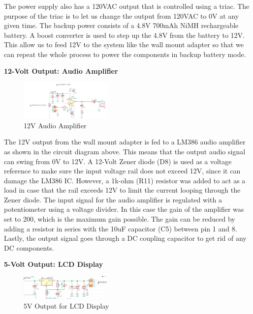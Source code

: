 \documentclass[journal,compsoc]{IEEEtran}
\begin{document}
The power supply also has a 120VAC output that is controlled using a triac. The purpose of the triac is to let us change the output from 120VAC to 0V at any given time. The backup power consists of a 4.8V 700mAh NiMH rechargeable battery. A boost converter is used to step up the 4.8V from the battery to 12V. This allow us to feed 12V to the system like the wall mount adapter so that we can repeat the whole process to power the components in backup battery mode.

\textbf {12-Volt Output: Audio Amplifier }

\begin{figure}[ht]	%
\centering
\includegraphics[width=0.4\textwidth]{Audio.png}
\caption{ 12V Audio Amplifier}
\label{Paudio}
\end{figure}

The 12V output from the wall mount adapter is fed to a LM386 audio amplifier as shown in the circuit diagram above. This means that the output audio signal can swing from 0V to 12V. A 12-Volt Zener diode (D8) is used as a voltage reference to make sure the input voltage rail does not exceed 12V, since it can damage the LM386 IC. However, a 1k-ohm (R11) resistor was added to act as a load in case that the rail exceeds 12V to limit the current looping through the Zener diode. The input signal for the audio amplifier is regulated with a potentiometer using a voltage divider. In this case the gain of the amplifier was set to 200, which is the maximum gain possible. The gain can be reduced by adding a resistor in series with the 10uF capacitor (C5) between pin 1 and 8. Lastly, the output signal goes through a DC coupling capacitor to get rid of any DC components. 


\textbf {5-Volt Output: LCD Display}

\begin{figure}[ht]	%
\centering
\includegraphics[width=0.4\textwidth]{Linear.png}
\caption{ 5V Output for LCD Display }
\label{Pdisplay}
\end{figure}
\end{document}
